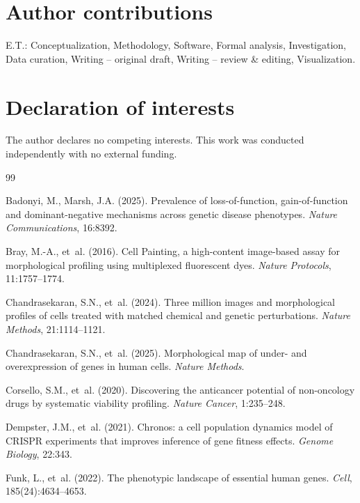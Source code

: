 \documentclass[11pt]{article}
\begin{document}
\section*{Author contributions}

E.T.: Conceptualization, Methodology, Software, Formal analysis,
Investigation, Data curation, Writing -- original draft, Writing --
review \& editing, Visualization.

\section*{Declaration of interests}

The author declares no competing interests.  This work was conducted
independently with no external funding.

\begin{thebibliography}{99}

Badonyi, M., Marsh, J.A. (2025).
Prevalence of loss-of-function, gain-of-function and dominant-negative mechanisms across genetic disease phenotypes.
\textit{Nature Communications}, 16:8392.

Bray, M.-A., et~al. (2016).
Cell Painting, a high-content image-based assay for morphological profiling using multiplexed fluorescent dyes.
\textit{Nature Protocols}, 11:1757--1774.

Chandrasekaran, S.N., et~al. (2024).
Three million images and morphological profiles of cells treated with matched chemical and genetic perturbations.
\textit{Nature Methods}, 21:1114--1121.

Chandrasekaran, S.N., et~al. (2025).
Morphological map of under- and overexpression of genes in human cells.
\textit{Nature Methods}.

Corsello, S.M., et~al. (2020).
Discovering the anticancer potential of non-oncology drugs by systematic viability profiling.
\textit{Nature Cancer}, 1:235--248.

Dempster, J.M., et~al. (2021).
Chronos: a cell population dynamics model of CRISPR experiments that improves inference of gene fitness effects.
\textit{Genome Biology}, 22:343.

Funk, L., et~al. (2022).
The phenotypic landscape of essential human genes.
\textit{Cell}, 185(24):4634--4653.


\end{thebibliography}
\end{document}

